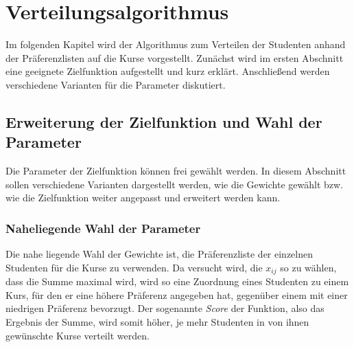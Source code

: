 \chapter{Verteilungsalgorithmus}
\label{chapter:algorithm}
    Im folgenden Kapitel wird der Algorithmus zum Verteilen der Studenten anhand der Präferenzlisten auf die Kurse vorgestellt.
    Zunächst wird im ersten Abschnitt eine geeignete Zielfunktion aufgestellt und kurz erklärt.
    Anschließend werden verschiedene Varianten für die Parameter diskutiert.
        
    \section{Erweiterung der Zielfunktion und Wahl der Parameter}
        Die Parameter der Zielfunktion können frei gewählt werden.
        In diesem Abschnitt sollen verschiedene Varianten dargestellt werden, wie die Gewichte gewählt bzw. wie die Zielfunktion weiter angepasst und erweitert werden kann.
        
        \subsection{Naheliegende Wahl der Parameter}
            Die nahe liegende Wahl der Gewichte ist, die Präferenzliste der einzelnen Studenten für die Kurse zu verwenden.
            Da versucht wird, die $ x_{ij} $ so zu wählen, dass die Summe maximal wird, wird so eine Zuordnung eines Studenten zu einem Kurs, für den er eine höhere Präferenz angegeben hat, gegenüber einem mit einer niedrigen Präferenz bevorzugt.
            Der sogenannte \textit{Score} der Funktion, also das Ergebnis der Summe, wird somit höher, je mehr Studenten in von ihnen gewünschte Kurse verteilt werden.
        